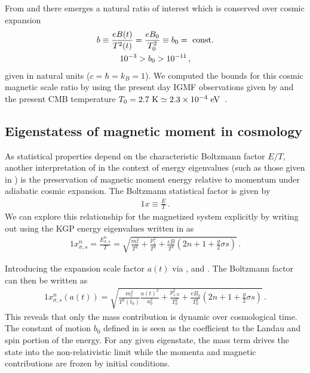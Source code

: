 From  and  there emerges a natural ratio of interest which is conserved over cosmic expansion 
\begin{gather}
 \label{tbscale}
 b \equiv\frac{e{B}(t)}{T^{2}(t)}=\frac{e{B}_{0}}{T_{0}^{2}}\equiv b_0={\rm\ const.}\\
 10^{-3}>b_{0}>10^{-11}\,,
\end{gather}
given in natural units ($c=\hbar=k_{B}=1$). We computed the bounds for this cosmic magnetic scale ratio by using the present day IGMF observations given by  and the present CMB temperature $T_{0}=2.7{\rm\ K}\simeq2.3\times10^{-4}\eV$~\citep{Planck:2018vyg}.

\subsection{Eigenstatess of magnetic moment in cosmology}
\label{sec:protection}

As statistical properties depend on the characteristic Boltzmann factor $E/T$, another interpretation of  in the context of energy eigenvalues (such as those given in ) is the preservation of magnetic moment energy relative to momentum under adiabatic cosmic expansion. The Boltzmann statistical factor is given by
\begin{alignat}{1}
    \label{Boltz} x\equiv\frac{E}{T}\,.
\end{alignat}
We can explore this relationship for the magnetized system explicitly by writing out  using the KGP energy eigenvalues written in  as
\begin{alignat}{1}
    \label{XExplicit} x_{\sigma,s}^{n} = \frac{E_{\sigma,s}^{n}}{T} = \sqrt{\frac{m_{e}^{2}}{T^{2}}+\frac{p_{z}^{2}}{T^{2}}+\frac{eB}{T^{2}}\left(2n+1+\frac{g}{2}\sigma s\right)}\,.
\end{alignat}

Introducing the expansion scale factor $a(t)$ via ,  and . The Boltzmann factor can then be written as
\begin{alignat}{1}
    \label{xscale:1} x_{\sigma,s}^{n}(a(t)) = \sqrt{\frac{m_{e}^{2}}{T^{2}(t_{0})}\frac{a(t)^{2}}{a_{0}^{2}}+\frac{p_{z,0}^{2}}{T_{0}^{2}}+\frac{eB_{0}}{T_{0}^{2}}\left(2n+1+\frac{g}{2}\sigma s\right)}\,.
\end{alignat}
This reveals that only the mass contribution is dynamic over cosmological time. The constant of motion $b_{0}$ defined in  is seen as the coefficient to the Landau and spin portion of the energy. For any given eigenstate, the mass term drives the state into the non-relativistic limit while the momenta and magnetic contributions are frozen by initial conditions. 

